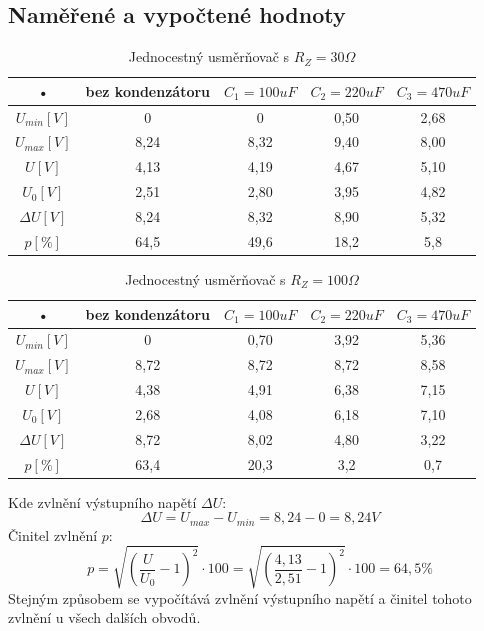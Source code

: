 \documentclass[12pt]{article} %
\begin{document}
\subsection{Naměřené a vypočtené hodnoty}
\begin{table}[H]
\caption{Jednocestný usměrňovač s $R_Z=30\Omega$}
\begin{tabular}{|c|c|c|c|c|}
\hline 
• & bez kondenzátoru & $C_1 = 100uF$ & $C_2 = 220uF$ & $C_3 = 470uF$ \\ 
\hline 
$U_{min} [V]$ & 0 & 0 & 0,50 & 2,68 \\ 
\hline 
$U_{max} [V]$ & 8,24 & 8,32 & 9,40 & 8,00 \\ 
\hline 
$U [V]$ & 4,13 & 4,19 & 4,67 & 5,10 \\ 
\hline 
$U_0 [V]$ & 2,51 & 2,80 & 3,95 & 4,82 \\ 
\hline 
$\Delta U [V]$ & 8,24 & 8,32 & 8,90 & 5,32 \\ 
\hline 
$p [\%]$ & 64,5 & 49,6 & 18,2 & 5,8 \\ 
\hline 
\end{tabular}
\end{table}

\begin{table}[H]
\caption{Jednocestný usměrňovač s $R_Z=100\Omega$}
\begin{tabular}{|c|c|c|c|c|}
\hline 
• & bez kondenzátoru & $C_1 = 100uF$ & $C_2 = 220uF$ & $C_3 = 470uF$ \\ 
\hline 
$U_{min} [V]$ & 0 & 0,70 & 3,92 & 5,36 \\ 
\hline 
$U_{max} [V]$ & 8,72 & 8,72 & 8,72 & 8,58 \\ 
\hline 
$U [V]$ & 4,38 & 4,91 & 6,38 & 7,15 \\ 
\hline 
$U_0 [V]$ & 2,68 & 4,08 & 6,18 & 7,10 \\ 
\hline 
$\Delta U [V]$ & 8,72 & 8,02 & 4,80 & 3,22 \\ 
\hline 
$p [\%]$ & 63,4 & 20,3 & 3,2 & 0,7 \\ 
\hline 
\end{tabular}
\end{table}

Kde zvlnění výstupního napětí $\Delta U$:
\begin{equation}
\Delta U = U_{max} - U_{min} = 8,24 - 0 = 8,24 V
\end{equation}
Činitel zvlnění $p$:
\begin{equation}
p = \sqrt{\left( \frac{U}{U_0} -1 \right)^2} \cdot 100 = \sqrt{\left( \frac{4,13}{2,51} -1 \right)^2} \cdot 100 = 64,5\%
\end{equation}
Stejným způsobem se vypočítává zvlnění výstupního napětí a činitel tohoto zvlnění u všech dalších obvodů.
\end{document}
